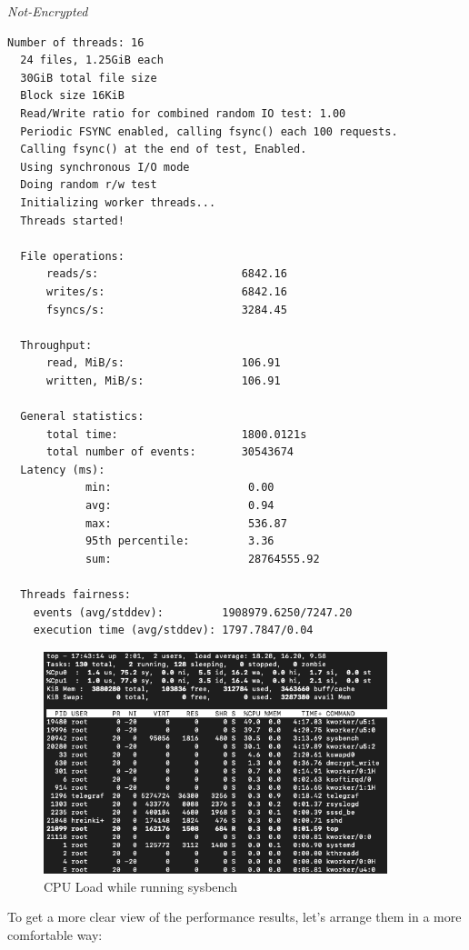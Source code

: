 \noindent\begin{minipage}[t]{0.45\linewidth}
  \centering
  \textit{Not-Encrypted}
  \begin{lstlisting}[basicstyle=\tiny,frame=single, label=cpu_test2]
  Number of threads: 16
  24 files, 1.25GiB each
  30GiB total file size
  Block size 16KiB
  Read/Write ratio for combined random IO test: 1.00
  Periodic FSYNC enabled, calling fsync() each 100 requests.
  Calling fsync() at the end of test, Enabled.
  Using synchronous I/O mode
  Doing random r/w test
  Initializing worker threads...
  Threads started!

  File operations:
      reads/s:                      6842.16
      writes/s:                     6842.16
      fsyncs/s:                     3284.45
  
  Throughput:
      read, MiB/s:                  106.91
      written, MiB/s:               106.91
  
  General statistics:
      total time:                   1800.0121s
      total number of events:       30543674
  Latency (ms):
            min:                     0.00
            avg:                     0.94
            max:                     536.87
            95th percentile:         3.36
            sum:                     28764555.92
  
  Threads fairness:
    events (avg/stddev):         1908979.6250/7247.20
    execution time (avg/stddev): 1797.7847/0.04
  \end{lstlisting}
\end{minipage}


\begin{figure}
  \includegraphics[width=10cm]{images/image5.png}
  \centering
  \caption{CPU Load while running sysbench}
\end{figure}

\newpage
To get a more clear view of the performance results, let's arrange them in a more comfortable way:

